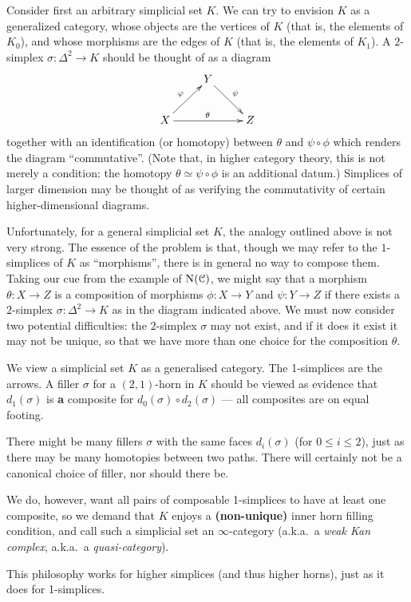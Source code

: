 \begin{1.1.2 inf-Categories}
Consider first an arbitrary simplicial set $K$. We can try to envision $K$ as a generalized category, whose objects are the vertices of $K$ (that is, the elements of $K_0$), and whose morphisms are the edges of $K$ (that is, the elements of $K_1$). A $2$-simplex
$\sigma: \Delta^2 \rightarrow K$ should be thought of as a diagram
$$ \xymatrix{ & Y \ar[dr]^{\psi} & \\
X \ar[ur]^{\phi} \ar[rr]^{\theta} & & Z }$$
together with an identification (or homotopy) between $\theta$ and $\psi \circ \phi$
which renders the diagram ``commutative''. (Note that, in higher category theory, 
this is not merely a condition: the homotopy $\theta \simeq \psi \circ \phi$ is an additional datum.)
Simplices of larger dimension may be thought of as verifying the
commutativity of certain higher-dimensional diagrams.

Unfortunately, for a general simplicial set $K$, the analogy
outlined above is not very strong. The essence of the problem is that, though we may refer
to the $1$-simplices of $K$ as ``morphisms'', there is in general no way to compose them.
Taking our cue from the example of $\operatorname{N}(\operatorname{\mathcal{C}})$,
we might say that a morphism $\theta:X \rightarrow Z$ is a composition of morphisms
$\phi: X \rightarrow Y$ and $\psi: Y \rightarrow Z$ if there exists a $2$-simplex
$\sigma: \Delta^2 \rightarrow K$ as in the diagram indicated above. 
We must now consider two potential difficulties: the $2$-simplex $\sigma$ may not exist, and
if it does it exist it may not be unique, so that we have more than one choice for the composition $\theta$.
\begin{shaded}
We view a simplicial set $K$ as a generalised category. The 1-simplices are the arrows. A filler $\sigma$ for a $(2,1)$-horn in $K$ should be viewed as evidence that $d_1(\sigma)$ is \textbf{a} composite for $d_0(\sigma)\circ d_2(\sigma)$ --- all composites are on equal footing.

There might be many fillers $\sigma$ with the same faces $d_i(\sigma)$ (for $0\leq i\leq2$), just as there may be many homotopies between two paths. There will certainly not be a canonical choice of filler, nor should there be.

We do, however, want all pairs of composable 1-simplices to have at least one composite, so we demand that $K$ enjoys a \textbf{(non-unique)} inner horn filling condition, and call such a simplicial set an $\infty$-category (a.k.a.\ a \textit{weak Kan complex}, a.k.a.\ a \textit{quasi-category}).

This philosophy works for higher simplices (and thus higher horns), just as it does for 1-simplices.
\end{shaded}


\end{1.1.2 inf-Categories}
